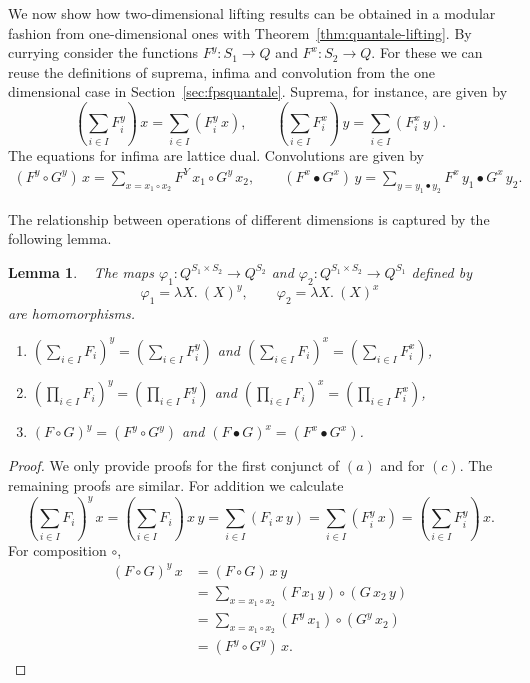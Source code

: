 \documentclass[12pt]{article}
\newtheorem{lemma}{Lemma}
\theoremstyle{definition}
\begin{document}
We now show how two-dimensional lifting results can be obtained in a
modular fashion from one-dimensional ones with
Theorem~\ref{thm:quantale-lifting}.  By currying consider the
functions $F^y:S_1\to Q$ and $F^x:S_2\to Q$. For these we can reuse the definitions of suprema, infima and
convolution from the one dimensional case in
Section~\ref{sec:fpsquantale}. Suprema, for instance, are given by
\begin{equation*}
  (\sum_{i\in I} F_{i}^y)\, x  =\sum_{i\in I}(F_{i}^y\, x),\qquad
  (\sum_{i\in I} F_{i}^x)\, y  =\sum_{i\in I}(F_{i}^x\, y).
\end{equation*}
The equations for infima are lattice dual.  Convolutions are given by
\begin{align*}
  (F^y\circ G^y) \, x  =\sum_{x=x_1\circ x_2}F^Y\, x_1\circ G^y\, x_2,
  \qquad
  (F^x\bullet G^x)\, y  =\sum_{y=y_1\bullet y_2}F^x\, y_1\bullet G^x\, y_2.
\end{align*}

The relationship between operations of different dimensions is
captured by the following lemma.
\begin{lemma}\label{P:spacered1}~
  The maps $\varphi_1: Q^{S_1\times S_2}\to Q^{S_2}$ and $\varphi_2:Q^{S_1\times S_2}\to
  Q^{S_1}$  defined by
  \begin{equation*}
    \varphi_1=\lambda X.\ (X)^y,\qquad \varphi_2=\lambda X.\ (X)^x
  \end{equation*}
  are homomorphisms.
\begin{enumerate}
\item $(\sum_{i\in I} F_i)^y= (\sum_{i\in I} F_{i}^y)$ and $(\sum_{i\in
    I} F_i)^x= (\sum_{i\in I} F_{i}^x)$,
\item $(\prod_{i\in I} F_i)^y= (\prod_{i\in I} F_{i}^y)$ and $(\prod_{i\in
    I} F_i)^x= (\prod_{i\in I} F_{i}^x)$,
\item $(F\circ G)^y= (F^y\circ G^y)$ and  $(F\bullet G)^x= (F^x\bullet G^x)$.
\end{enumerate}
\end{lemma}
\begin{proof}
  We only provide proofs for the first conjunct of $(a)$ and for
  $(c)$. The remaining proofs are similar.  For addition we calculate
  \begin{equation*}
    (\sum_{i\in I} F_i)^y\, x = (\sum_{i\in I} F_i)\, x\, y
    = \sum_{i\in I}(F_i\, x \, y)
    = \sum_{i\in I} (F_{i}^y\, x)
    = (\sum_{i\in I}F_{i}^y)\, x.
  \end{equation*}
  For composition $\circ$,
  \begin{align*}
   (F\circ G)^y\, x  &=(F\circ G)\, x\, y\\
  &=\sum_{x=x_1\circ x_2} (F\, x_1\, y)\circ (G\, x_2\, y)\\
&=\sum_{x=x_1\circ x_2} (F^y\, x_1)\circ (G^y\, x_2)\\
&= (F^y\circ G^y)\, x.
  \end{align*}
\end{proof}
\end{document}
